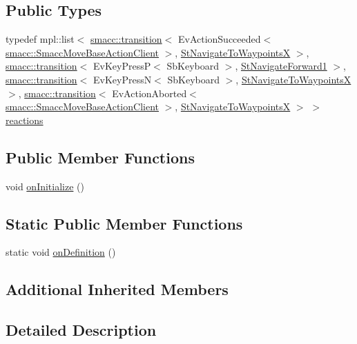 \subsection*{Public Types}
\begin{DoxyCompactItemize}
\item 
typedef mpl\+::list$<$ \hyperlink{classsmacc_1_1transition}{smacc\+::transition}$<$ Ev\+Action\+Succeeded$<$ \hyperlink{classsmacc_1_1SmaccMoveBaseActionClient}{smacc\+::\+Smacc\+Move\+Base\+Action\+Client} $>$, \hyperlink{structStNavigateToWaypointsX}{St\+Navigate\+To\+WaypointsX} $>$, \hyperlink{classsmacc_1_1transition}{smacc\+::transition}$<$ Ev\+Key\+PressP$<$ Sb\+Keyboard $>$, \hyperlink{structStNavigateForward1}{St\+Navigate\+Forward1} $>$, \hyperlink{classsmacc_1_1transition}{smacc\+::transition}$<$ Ev\+Key\+PressN$<$ Sb\+Keyboard $>$, \hyperlink{structStNavigateToWaypointsX}{St\+Navigate\+To\+WaypointsX} $>$, \hyperlink{classsmacc_1_1transition}{smacc\+::transition}$<$ Ev\+Action\+Aborted$<$ \hyperlink{classsmacc_1_1SmaccMoveBaseActionClient}{smacc\+::\+Smacc\+Move\+Base\+Action\+Client} $>$, \hyperlink{structStNavigateToWaypointsX}{St\+Navigate\+To\+WaypointsX} $>$ $>$ \hyperlink{structStRotateDegrees2_a2570a385b8f4bda95f392b8eaade144a}{reactions}
\end{DoxyCompactItemize}
\subsection*{Public Member Functions}
\begin{DoxyCompactItemize}
\item 
void \hyperlink{structStRotateDegrees2_a6fa87a927ab3eac0fd2f609f66ec355a}{on\+Initialize} ()
\end{DoxyCompactItemize}
\subsection*{Static Public Member Functions}
\begin{DoxyCompactItemize}
\item 
static void \hyperlink{structStRotateDegrees2_af162a3bc8f3893613d0aa592ccebcdc2}{on\+Definition} ()
\end{DoxyCompactItemize}
\subsection*{Additional Inherited Members}


\subsection{Detailed Description}


